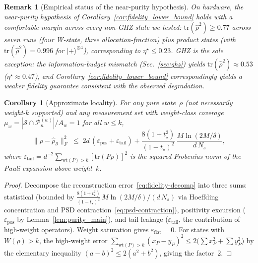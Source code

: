 \documentclass[twocolumn,prx,aps,superscriptaddress,longbibliography,floatfix]{revtex4-2}
\newtheorem{corollary}[theorem]{Corollary}
\newtheorem*{remark}{Remark}
\newcommand{\pclaim}[4]{}
\begin{document}
\begin{remark}[Empirical status of the near-purity hypothesis]
On hardware, the near-purity hypothesis of
Corollary~\ref{cor:fidelity_lower_bound} holds with a comfortable
margin across every non-GHZ state we tested:
$\mathrm{tr}(\hat\rho^2) \ge 0.77$ across seven runs
(four W-state, three allocation-fraction) plus product states
(with $\mathrm{tr}(\hat\rho^2) = 0.996$ for
$|{+}\rangle^{\otimes 4}$), corresponding to $\eta^{\star} \le 0.23$.
GHZ is the sole exception: the information-budget mismatch
(Sec.~\ref{sec:ghz}) yields $\mathrm{tr}(\hat\rho^2) \approx 0.53$
($\eta^{\star} \approx 0.47$), and
Corollary~\ref{cor:fidelity_lower_bound} correspondingly yields a
weaker fidelity guarantee consistent with the observed degradation.
\end{remark}

\pclaim{env:cor:approx_local}{proved}{*}{cor:approx_local}%
\begin{corollary}[Approximate locality]
\label{cor:approx_local}
For any pure state~$\rho$ (not necessarily weight-$k$ supported) and any
measurement set with weight-class coverage
$\mu_w = |\mathcal{S} \cap \mathcal{P}_n^{(w)}|/A_w = 1$
for all $w \le k$,
\begin{equation}\label{eq:approx-local}
  \|\rho - \hat\rho_{\mathcal{S}}\|_F^2 \;\le\;
  2d\,(\varepsilon_{\mathrm{pos}} + \varepsilon_{\mathrm{tail}})
  + \frac{8(1{+}t_\star^2)}{(1{-}t_\star)^2}
    \,\frac{M\ln(2M/\delta)}{d\,N_s},
\end{equation}
where $\varepsilon_{\mathrm{tail}} = d^{-2}
\sum_{\mathrm{wt}(P)>k} [\mathrm{tr}(P\rho)]^2$
is the squared Frobenius norm of the Pauli expansion above
weight~$k$.
\end{corollary}
\begin{proof}
Decompose the reconstruction error~\eqref{eq:fidelity-decomp}
into three sums: statistical (bounded by
$\tfrac{8(1+t_\star^2)}{(1-t_\star)^2}\,M\ln(2M/\delta)/(d\,N_s)$
via Hoeffding concentration
and PSD contraction~\eqref{eq:psd-contraction}),
positivity excursion ($\varepsilon_{\mathrm{pos}}$ by
Lemma~\ref{lem:purity_main}), and tail leakage
($\varepsilon_{\mathrm{tail}}$, the contribution of
high-weight operators).
Weight saturation gives $\varepsilon_{\mathrm{flat}} = 0$.
For states with $W(\rho) > k$, the high-weight error
$\sum_{\mathrm{wt}(P)>k}(x_P - y_P)^2
\le 2\bigl(\sum x_P^2 + \sum y_P^2\bigr)$
by the elementary inequality $(a{-}b)^2 \le 2(a^2 + b^2)$,
giving the factor~$2$.
\end{proof}
\end{document}
